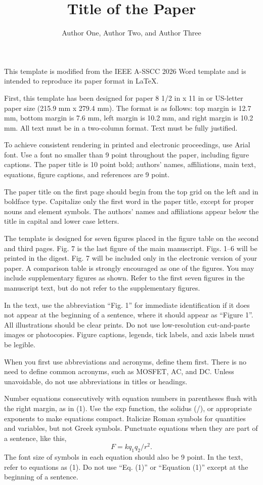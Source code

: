 \documentclass{asscc2026}
\title{Title of the Paper}
\author{Author One\authorrefmark{1}, Author Two\authorrefmark{2}, and Author Three\authorrefmark{1}}
\begin{document}
\maketitle

This template is modified from the IEEE A-SSCC 2026 Word template and is intended to reproduce its paper format in LaTeX.

First, this template has been designed for paper 8 1/2 in x 11 in or US-letter paper size (215.9 mm x 279.4 mm). The format is as follows: top margin is 12.7 mm, bottom margin is 7.6 mm, left margin is 10.2 mm, and right margin is 10.2 mm. All text must be in a two-column format. Text must be fully justified.

To achieve consistent rendering in printed and electronic proceedings, use Arial font. Use a font no smaller than 9 point throughout the paper, including figure captions. The paper title is 10 point bold; authors' names, affiliations, main text, equations, figure captions, and references are 9 point.

The paper title on the first page should begin from the top grid on the left and in boldface type. Capitalize only the first word in the paper title, except for proper nouns and element symbols. The authors' names and affiliations appear below the title in capital and lower case letters.

The template is designed for seven figures placed in the figure table on the second and third pages. Fig. 7 is the last figure of the main manuscript. Figs. 1--6 will be printed in the digest. Fig. 7 will be included only in the electronic version of your paper. A comparison table is strongly encouraged as one of the figures. You may include supplementary figures as shown. Refer to the first seven figures in the manuscript text, but do not refer to the supplementary figures.

In the text, use the abbreviation ``Fig. 1'' for immediate identification if it does not appear at the beginning of a sentence, where it should appear as ``Figure 1''. All illustrations should be clear prints. Do not use low-resolution cut-and-paste images or photocopies. Figure captions, legends, tick labels, and axis labels must be legible.

When you first use abbreviations and acronyms, define them first. There is no need to define common acronyms, such as MOSFET, AC, and DC. Unless unavoidable, do not use abbreviations in titles or headings.

Number equations consecutively with equation numbers in parentheses flush with the right margin, as in (1). Use the exp function, the solidus (/), or appropriate exponents to make equations compact. Italicize Roman symbols for quantities and variables, but not Greek symbols. Punctuate equations when they are part of a sentence, like this,
\begin{equation}
  F = k q_1 q_2 / r^2 .
\end{equation}
The font size of symbols in each equation should also be 9 point. In the text, refer to equations as (1). Do not use ``Eq. (1)'' or ``Equation (1)'' except at the beginning of a sentence.
\end{document}
